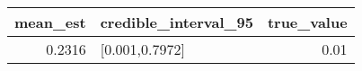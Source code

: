 \begin{longtable}{rlr}
\toprule
mean\_est & credible\_interval\_95 & true\_value \\ 
\midrule
0.2316 & [0.001,0.7972] & 0.01 \\ 
\bottomrule
\end{longtable}

